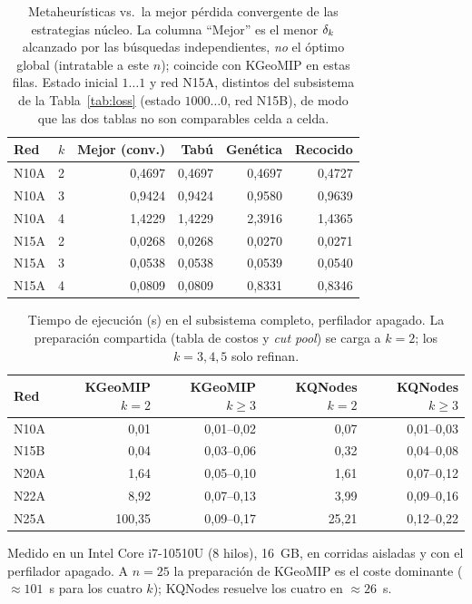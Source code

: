 \documentclass[11pt,letterpaper]{article}
\begin{document}
\begin{table}[H]
	\centering\footnotesize
	\caption{Metaheurísticas vs.\ la mejor pérdida convergente de las estrategias núcleo.
		La columna ``Mejor'' es el menor $\delta_k$ alcanzado por las búsquedas independientes,
		\emph{no} el óptimo global (intratable a este $n$); coincide con KGeoMIP en estas
		filas. Estado inicial $1\dots1$ y red N15A, distintos del subsistema de la
		Tabla~\ref{tab:loss} (estado $1000\dots0$, red N15B), de modo que las dos tablas no
		son comparables celda a celda.}
	\begin{tabular}{@{}llrrrr@{}}
		\toprule
		Red  & $k$ & Mejor (conv.) & Tabú   & Genética & Recocido \\
		\midrule
		N10A & 2   & 0,4697        & 0,4697 & 0,4697   & 0,4727   \\
		N10A & 3   & 0,9424        & 0,9424 & 0,9580   & 0,9639   \\
		N10A & 4   & 1,4229        & 1,4229 & 2,3916   & 1,4365   \\
		N15A & 2   & 0,0268        & 0,0268 & 0,0270   & 0,0271   \\
		N15A & 3   & 0,0538        & 0,0538 & 0,0539   & 0,0540   \\
		N15A & 4   & 0,0809        & 0,0809 & 0,8331   & 0,8346   \\
		\bottomrule
	\end{tabular}
	\label{tab:meta}
\end{table}

\begin{table}[H]
	\centering\footnotesize
	\caption{Tiempo de ejecución (s) en el subsistema completo, perfilador apagado. La
		preparación compartida (tabla de costos y \emph{cut pool}) se carga a $k=2$; los
		$k=3,4,5$ solo refinan.}
	\begin{tabular}{@{}lrrrr@{}}
		\toprule
		Red  & KGeoMIP $k{=}2$ & KGeoMIP $k{\ge}3$ & KQNodes $k{=}2$ & KQNodes $k{\ge}3$ \\
		\midrule
		N10A & 0,01            & 0,01--0,02        & 0,07            & 0,01--0,03        \\
		N15B & 0,04            & 0,03--0,06        & 0,32            & 0,04--0,08        \\
		N20A & 1,64            & 0,05--0,10        & 1,61            & 0,07--0,12        \\
		N22A & 8,92            & 0,07--0,13        & 3,99            & 0,09--0,16        \\
		N25A & 100,35          & 0,09--0,17        & 25,21           & 0,12--0,22        \\
		\bottomrule
	\end{tabular}
	\label{tab:time}
	\par\smallskip
	{\footnotesize Medido en un Intel Core i7-10510U (8 hilos), 16~GB, en corridas
		aisladas y con el perfilador apagado. A $n=25$ la preparación de KGeoMIP es el coste
		dominante ($\approx 101$~s para los cuatro $k$); KQNodes resuelve los cuatro en
		$\approx 26$~s.}
\end{table}
\end{document}
